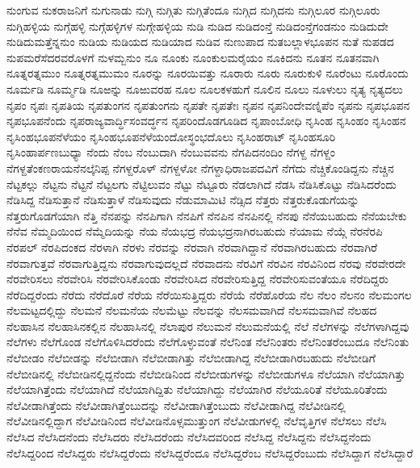 {ನುಂಗುವ
ನುಕರಾಜನಿಗೆ
ನುಗುನಾಡು
ನುಗ್ಗಿ
ನುಗ್ಗಿತು
ನುಗ್ಗಿತೆಂದೂ
ನುಗ್ಗಿದ
ನುಗ್ಗಿದನು
ನುಗ್ಗಿಲೂರ
ನುಗ್ಗಿಲೂರು
ನುಗ್ಗಿಹಳ್ಳಿಯ
ನುಗ್ಗೆಹಳ್ಳಿ
ನುಗ್ಗೆಹಳ್ಳಿಗಳ
ನುಗ್ಗೇಹಳ್ಳಿಯ
ನುಡಿ
ನುಡಿದ
ನುಡಿದಂನ್ತೆ
ನುಡಿದಂನ್ತೆಗಂಡನುಂ
ನುಡಿದುದೇ
ನುಡಿದುಮತ್ತೆನ್ನನುಂ
ನುಡಿಯ
ನುಡಿಯದ
ನುಡಿಯಾದ
ನುಡಿವ
ನುಣುಪಾದ
ನುತಬಲ್ಲಾಳಭೂಪನ
ನುತೆ
ನುಪಡದ
ನುಪಮರೆಸೆದರವರೊಳಗೆ
ನುಳಮ್ಬನುಂ
ನೂ
ನೂಂಕು
ನೂಂಕುಲಮರೈಯಂ
ನೂಕಿದನು
ನೂತನ
ನೂತನವಾಗಿ
ನೂತ್ನರತ್ನಮುಂ
ನೂತ್ನರತ್ನಮುಮಂ
ನೂರನ್ನು
ನೂರಯಿವತ್ತು
ನೂರಾರು
ನೂರು
ನೂರುಕುಳಿ
ನೂರೆಂಟು
ನೂರೊಂದು
ನೂರ್ಮಡಿ
ನೂರ್ಮ್ಮಡಿ
ನೂಱನ್ನು
ನೂಱುವರಹ
ನೂಲ
ನೂಲಕಳಹುಗೆ
ನೂಲಿನ
ನೂಲು
ನೂಳುಲು
ನೃತ್ಯ
ನೃತ್ಯದಲು
ನೃಪಂ
ನೃಪಃ
ನೃಪತಿಯ
ನೃಪತುಂಗನ
ನೃಪತುಂಗನು
ನೃಪತೇ
ನೃಪತೇಃ
ನೃಪನ
ನೃಪನಿಂದೇವಣ್ನಿಪೆಂ
ನೃಪನು
ನೃಪಭೂಪನ
ನೃಪಭೂಪನೆಂದು
ನೃಪರಾಜ್ಯವಾರ್ದ್ಧಿಸಂವರ್ದ್ಧನ
ನೃಪರಿಂದೊಡಗೂಡಿದ
ನೃಪಾಂಬೋಧಿ
ನೃಸಿಂಹ
ನೃಸಿಂಹಂ
ನೃಸಿಂಹನ
ನೃಸಿಂಹಭೂಪನೆಳೆಯಂ
ನೃಸಿಂಹಭೂಪನೆಳೆಯಂದೋಸ್ಥಂಭದೊಲು
ನೃಸಿಂಹರಾಟ್
ನೃಸಿಂಹಸೂರಿ
ನೃಸಿಂಹಾರ್ಪಣಬುಧ್ಯಾ
ನೆಂದು
ನೆಂಬ
ನೆಂಬುದಾಗಿ
ನೆಂಬುವವನು
ನೆಗಪಿದನಂದಿಂ
ನೆಗಳ್ದ
ನೆಗಳ್ದಂ
ನೆಗಳ್ದತೆಂಕಣರಾಯನೆನಲ್ಕೆನಿಪ್ಪ
ನೆಗಳ್ದರೊಳ್
ನೆಗಳ್ದಳೋ
ನೆಗಳ್ದಾಧಿರಾಜಪದವಿಗೆ
ನೆಗೆದು
ನೆಚ್ಚಿಕೊಂಡಿದ್ದನು
ನೆಚ್ಚಿನ
ನೆಟ್ಟಕಲ್ಲು
ನೆಟ್ಟನು
ನೆಟ್ಟನೆ
ನೆಟ್ಟಲಗು
ನೆಟ್ಟಿಲುವಂ
ನೆಟ್ಟು
ನೆಟ್ಟೂರು
ನೆಡಲಾಗಿದೆ
ನೆಡಸಿ
ನೆಡಿಸಿಕೊಟ್ಟು
ನೆಡಿಸಿದರೆಂದು
ನೆಡಿಸಿದ್ದ
ನೆಡಿಸುತ್ತಾನೆ
ನೆಡಿಸುತ್ತಾಳೆ
ನೆಡಿಸುವುದು
ನೆಡುಮಾಮಿಟಿ
ನೆಡ್ಸಿದ
ನೆತ್ತರು
ನೆತ್ತರುಕೊಡುಗೆಯನ್ನು
ನೆತ್ತರುಗೊಡಗೆಯಾಗಿ
ನೆತ್ತಿ
ನೆನಪನ್ನು
ನೆನಪಿಗಾಗಿ
ನೆನಪಿಗೆ
ನೆನಪಿನ
ನೆನಪಿನಲ್ಲಿ
ನೆನಪು
ನೆನೆಯಬಹುದು
ನೆನೆಯಬೇಕು
ನೆನೆವ
ನೆಮ್ಮದಿಯಿಂದ
ನೆಮ್ಮೆದಿಯನ್ನು
ನೆಯ
ನೆಯಭದ್ರ
ನೆಯಭದ್ರನಾಗಿರಬಹುದು
ನೆಯಾಮ
ನೆಯ್ಗೆ
ನೆರನೆರಪಿ
ನೆರಪಲ್
ನೆರಪಿದಂಕದ
ನೆರಳಾಗಿ
ನೆರಳು
ನೆರವನ್ನು
ನೆರವಾಗಿ
ನೆರವಾಗಿದ್ದಾನೆ
ನೆರವಾಗಿರಬಹುದು
ನೆರವಾಗಿರೆ
ನೆರವಾಗುತ್ತವೆ
ನೆರವಾಗುತ್ತಿದ್ದನು
ನೆರವಾಗುವುದಲ್ಲದೆ
ನೆರವಾದನು
ನೆರವಿಗೆ
ನೆರವಿನ
ನೆರವಿನಿಂದ
ನೆರವು
ನೆರವೇರದೇ
ನೆರವೇರಿಸಲು
ನೆರವೇರಿಸಿ
ನೆರವೇರಿಸಿಕೊಂಡು
ನೆರವೇರಿಸಿದ
ನೆರವೇರಿಸುತ್ತಿದ್ದ
ನೆರವೇರಿಸುವಂತೆಯೂ
ನೆರೆದಿದ್ದರು
ನೆರೆದಿದ್ದರೆಂದು
ನೆರೆದು
ನೆರೆದೊರೆ
ನೆರೆಯ
ನೆರೆಯಿಸುತ್ತಿದ್ದರು
ನೆರೆಯೆ
ನೆರೆಹೊರೆಯ
ನೆಲ
ನೆಲಂ
ನೆಲನಂ
ನೆಲಮಂಗಲ
ನೆಲಮಟ್ಟದಲ್ಲಿದ್ದು
ನೆಲಮನೆ
ನೆಲಮನೆಯ
ನೆಲಮೆಟ್ಟು
ನೆಲವನ್ನು
ನೆಲಸಮವಾಗಿದೆ
ನೆಲಸಮವಾಗಿವೆ
ನೆಲಹದ
ನೆಲಹಾಸಿನ
ನೆಲಹಾಸಿನಕಲ್ಲಿನ
ನೆಲಹಾಸಿನಲ್ಲಿ
ನೆಲಾಪುರ
ನೆಲುಮನೆ
ನೆಲುಮನೆಯಲ್ಲಿ
ನೆಲೆ
ನೆಲೆಗಳನ್ನು
ನೆಲೆಗಳಾಗಿದ್ದವು
ನೆಲೆಗಳು
ನೆಲೆಗೊಂಡ
ನೆಲೆಗೊಳಿಸಿದರೆಂದು
ನೆಲೆಗೊಳ್ಳುವಂತೆ
ನೆಲೆನಿಂತ
ನೆಲೆನಿಂತರು
ನೆಲೆನಿಂತರೆಂಬುದೂ
ನೆಲೆನಿಂತು
ನೆಲೆಬೀಡಂ
ನೆಲೆಬೀಡನ್ನು
ನೆಲೆಬೀಡಾಗಿ
ನೆಲೆಬೀಡಾಗಿತ್ತು
ನೆಲೆಬೀಡಾಗಿದ್ದ
ನೆಲೆಬೀಡಾಗಿರಬಹುದು
ನೆಲೆಬೀಡಿಗೆ
ನೆಲೆಬೀಡಿನಲ್ಲಿ
ನೆಲೆಬೀಡಿನಲ್ಲಿದ್ದನೆಂದು
ನೆಲೆಬೀಡಿನಿಂದ
ನೆಲೆಬೀಡುಗಳನ್ನು
ನೆಲೆಬೀಡುಗಳೂ
ನೆಲೆಯಾಗಿ
ನೆಲೆಯಾಗಿತ್ತು
ನೆಲೆಯಾಗಿತ್ತೆಂದು
ನೆಲೆಯಾಗಿದೆ
ನೆಲೆಯಾಗಿದ್ದಿತು
ನೆಲೆಯಾಗಿದ್ದು
ನೆಲೆಯಾಗಿರ
ನೆಲೆಯೂರಿತೆ
ನೆಲೆಯೂರಿತೆಂದು
ನೆಲೆವೀಡಾಗಿತ್ತೆಂದು
ನೆಲೆವೀಡಾಗಿತ್ತೆಂಬುದನ್ನು
ನೆಲೆವೀಡಾಗಿತ್ತೆಂಬುದು
ನೆಲೆವೀಡಾಗಿದ್ದ
ನೆಲೆವೀಡಿನಲ್ಲಿ
ನೆಲೆವೀಡಿನಲ್ಲಿದ್ದಾಗ
ನೆಲೆವೀಡಿನಿಂದ
ನೆಲೆವೀಡಿನೊಳ್ಸಮುತ್ತುಂಗ
ನೆಲೆವೀಡುಗಳಲ್ಲಿ
ನೆಲೆವೃತ್ತಿಗಳ
ನೆಲೆಸಲು
ನೆಲೆಸಿ
ನೆಲೆಸಿದ
ನೆಲೆಸಿದನೆಂದು
ನೆಲೆಸಿದರು
ನೆಲೆಸಿದರೆಂದು
ನೆಲೆಸಿದವರಿಂದ
ನೆಲೆಸಿದ್ದ
ನೆಲೆಸಿದ್ದನು
ನೆಲೆಸಿದ್ದನೆಂದು
ನೆಲೆಸಿದ್ದರಿಂದ
ನೆಲೆಸಿದ್ದರು
ನೆಲೆಸಿದ್ದರೆಂದು
ನೆಲೆಸಿದ್ದರೆಂದೂ
ನೆಲೆಸಿದ್ದರೆಂಬ
ನೆಲೆಸಿದ್ದರೆಂಬುದು
ನೆಲೆಸಿದ್ದಾಗ
ನೆಲೆಸಿದ್ದಾರೆ
}
